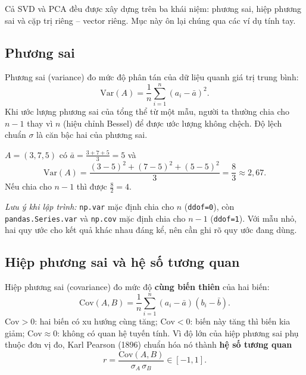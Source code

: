 Cả SVD và PCA đều được xây dựng trên ba khái niệm: phương sai, hiệp phương sai và cặp trị riêng -- vector riêng. Mục này ôn lại chúng qua các ví dụ tính tay.

\subsection{Phương sai}

\begin{definition}
Phương sai (variance) đo mức độ phân tán của dữ liệu quanh giá trị trung bình:
\begin{equation}
    \mathrm{Var}(A) = \frac{1}{n}\sum_{i=1}^{n}(a_i - \bar{a})^2 .
\end{equation}
Khi ước lượng phương sai của tổng thể từ một mẫu, người ta thường chia cho $n - 1$ thay vì $n$ (hiệu chỉnh Bessel) để được ước lượng không chệch. Độ lệch chuẩn $\sigma$ là căn bậc hai của phương sai.
\end{definition}

\begin{example}
$A = (3, 7, 5)$ có $\bar{a} = \frac{3 + 7 + 5}{3} = 5$ và
\[
    \mathrm{Var}(A) = \frac{(3 - 5)^2 + (7 - 5)^2 + (5 - 5)^2}{3} = \frac{8}{3} \approx 2{,}67 .
\]
Nếu chia cho $n - 1$ thì được $\frac{8}{2} = 4$.
\end{example}

\noindent\textit{Lưu ý khi lập trình:} \texttt{np.var} mặc định chia cho $n$ (\texttt{ddof=0}), còn \texttt{pandas.Series.var} và \texttt{np.cov} mặc định chia cho $n - 1$ (\texttt{ddof=1}). Với mẫu nhỏ, hai quy ước cho kết quả khác nhau đáng kể, nên cần ghi rõ quy ước đang dùng.

\subsection{Hiệp phương sai và hệ số tương quan}

\begin{definition}
Hiệp phương sai (covariance) đo mức độ \textbf{cùng biến thiên} của hai biến:
\begin{equation}
    \mathrm{Cov}(A, B) = \frac{1}{n}\sum_{i=1}^{n}(a_i - \bar{a})(b_i - \bar{b}).
\end{equation}
$\mathrm{Cov} > 0$: hai biến có xu hướng cùng tăng; $\mathrm{Cov} < 0$: biến này tăng thì biến kia giảm; $\mathrm{Cov} \approx 0$: không có quan hệ tuyến tính. Vì độ lớn của hiệp phương sai phụ thuộc đơn vị đo, Karl Pearson (1896) chuẩn hóa nó thành \textbf{hệ số tương quan}
\begin{equation}
    r = \frac{\mathrm{Cov}(A, B)}{\sigma_A\,\sigma_B} \in [-1, 1].
\end{equation}
\end{definition}

